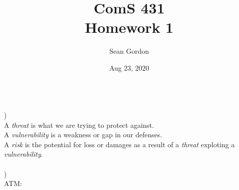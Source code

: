 \documentclass[12pt]{article}
\title{ComS 431\\Homework 1}
\author{Sean Gordon}
\date{Aug 23, 2020}
\begin{document}
\maketitle


\noindent\hrulefill \\


)\\
\indent A \textit{threat} is what we are trying to protect against.\\
\indent A \textit{vulnerability} is a weakness or gap in our defenses.\\
\indent A \textit{risk} is the potential for loss or damages as a result of a \textit{threat} exploting a \textit{vulnerability}.\\


\noindent \hrulefill \\


)\\
\indent ATM:
\end{document}
